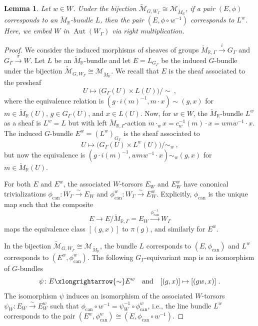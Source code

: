 \documentclass[10pt, a4paper]{amsart}
\newtheorem{lemma}[theorem]{Lemma}
\theoremstyle{definition}
\theoremstyle{myitemstyle}
\newcommand{\R}{\mathbb{R}}
\newcommand{\Mcheck}{{\check{M}}}
\newcommand{\mc}[1]{{\mathcal{#1}}}
\newcommand{\wmc}[1]{{\widetilde{\mathcal{#1}}}}
\DeclareMathOperator{\Aut}{Aut}
\newcommand{\Ga}{\Gamma}
\begin{document}
\begin{lemma}
\label{lem:meaning of conjugation}
    Let $w\in W$. Under the bijection $\wmc M_{G,W_\Gamma}\cong \mc M_{\Mcheck_\R}$, if a pair $(E,\phi)$ corresponds to an $\Mcheck_\R$-bundle $L$, then the pair $(E,\phi\circ w^{-1})$ corresponds to $L^w$. Here, we embed $W$ in $\Aut(W_\Gamma)$ via right multiplication.
\end{lemma}

\begin{proof}
We consider the induced morphisms of sheaves of groups
$\Mcheck_{\R,\Ga}  \xrightarrow{i} G_\Ga$ and $G_\Ga \xrightarrow{\pi} W$. Let $L$ be an $\Mcheck_\R$-bundle and let $E = L_{G_\Ga}$ be the induced $G$-bundle under the bijection $\wmc M_{G,W_\Gamma}\cong \mc M_{\Mcheck_\R}$. We recall that $E$ is the sheaf associated to the presheaf
\[
U\longmapsto  \big( G_\Ga(U) \times L(U) \big) \big/ \sim \ ,
\]
where the equivalence relation is $(g \cdot i(m)^{-1}, m \cdot x) \sim (g, x)$ for $m \in \Mcheck_\R(U)$, $g \in G_\Ga(U)$, and $x \in L(U)$. 
Now, for $w \in W$, the $\Mcheck_\R$-bundle $L^w$ as a sheaf is $L^w = L$ but with left $\Mcheck_{\R,\Ga}$-action $m \cdot_w x = c_w^{-1}(m) \cdot x = wmw^{-1} \cdot x$. The induced $G$-bundle $E^w = (L^w)_{G_\Ga}$ is the sheaf associated to
\[
U\longmapsto  \big( G_\Gamma(U) \times L^w(U) \big) \big/ \sim_w \ ,
\]
but now the equivalence is $(g \cdot i(m)^{-1}, wmw^{-1} \cdot x) \sim_w (g, x)$ for $m \in \Mcheck_\R(U)$.

For both $E$ and $E^w$, the associated $W$-torsors $E_W$ and $E_W^w$ have canonical trivializations $\phi_{\mathrm{can}}: W_\Ga \xrightarrow{\sim} E_W$ and $\phi_{\mathrm{can}}^w: W_\Ga \xrightarrow{\sim} E_W^w$. Explicitly, $\phi_{\mathrm{can}}$ is the unique map such that the composite
\[
E\longrightarrow E/\Mcheck_{\R,\Ga}=E_W\xrightarrow{\phi_{\mathrm{can}}^{-1}} W_\Gamma 
\]
maps the equivalence class $[(g,x)]$ to $\pi(g)$, and similarly for $E^w$.

In the bijection $\wmc M_{G,W_\Gamma}\cong \mc M_{\Mcheck_\R}$, the bundle $L$ corresponds to $(E,\phi_\mathrm{can})$ and $L^w$ corresponds to $(E^w,\phi^w_\mathrm{can})$. The following $G_\Ga$-equivariant map is an isomorphism of $G$-bundles
\[
\psi \colon E \xlongrightarrow{\sim} E^w \quad \text{and}\quad[(g, x)] \mapsto [(g w, x)] \ .
\]
The isomorphism $\psi$ induces an isomorphism of the associated $W$-torsors $\psi_W \colon E_W \xrightarrow{\sim} E^w_W$ such that $\phi_\mathrm{can} \circ w^{-1} = \psi_W^{-1} \circ \phi_\mathrm{can}^w$, i.e., the line bundle $L^w$ corresponds to the pair $(E^w,\phi^w_\mathrm{can}) \cong (E,\phi_\mathrm{can} \circ w^{-1})$. 
\end{proof}
\end{document}
